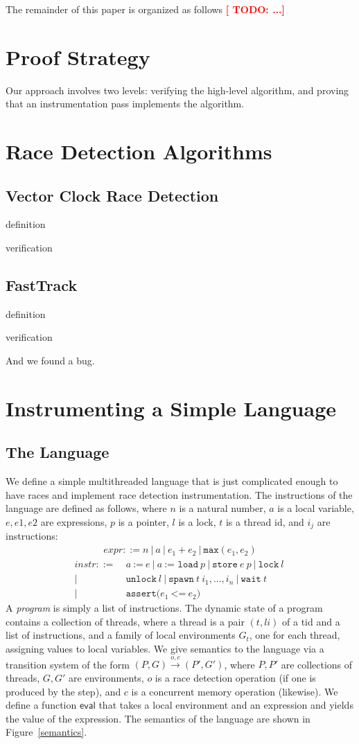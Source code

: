 \documentclass[preprint, 10pt]{sigplanconf}
\newcommand{\TODO}[1]{\textbf{\textcolor{red}{[ TODO: #1]}}}
\newcommand{\assign}[2]{#1\ \texttt{:=}\ #2}
\newcommand{\load}[2]{#1\ \texttt{:= load}\ #2}
\newcommand{\store}[2]{\texttt{store}\ #2\ #1}
\newcommand{\lock}[1]{\texttt{lock}\ #1}
\newcommand{\unlock}[1]{\texttt{unlock}\ #1}
\newcommand{\spawn}[2]{\texttt{spawn}\ #1\ #2}
\newcommand{\wait}[1]{\texttt{wait}\ #1}
\newcommand{\assert}[2]{\texttt{assert(}#1\ \texttt{<=}\ #2\texttt{)}}
\begin{document}
The remainder of this paper is organized as follows \TODO{...}

\section{Proof Strategy}
Our approach involves two levels: verifying the high-level algorithm, and proving that an instrumentation pass implements the algorithm.

\section{Race Detection Algorithms}
\subsection{Vector Clock Race Detection}
definition

verification

\subsection{FastTrack}
definition

verification

And we found a bug.

\section{Instrumenting a Simple Language}
\subsection{The Language}
We define a simple multithreaded language that is just complicated enough to have races and implement race detection instrumentation. The instructions of the language are defined as follows, where $n$ is a natural number, $a$ is a local variable, $e, e1, e2$ are expressions, $p$ is a pointer, $l$ is a lock, $t$ is a thread id, and $i_j$ are instructions:
\begin{align*}\mathit{expr} ::= n~|~a~|~e_1 + e_2~|~\mathtt{max}(e_1, e_2)\end{align*}
\begin{align*}\mathit{instr} ::=\ &\assign{a}{e}~|~\load{a}{p}~|~\store{p}{e}~|~\lock{l}~\\|~&\unlock{l}~|~\spawn{t}{i_1, ..., i_n}~|~\wait{t}~\\|~&\assert{e_1}{e_2}\end{align*}
A \emph{program} is simply a list of instructions. The dynamic state of a program contains a collection of threads, where a thread is a pair $(t, \mathit{li})$ of a tid and a list of instructions, and a family of local environments $G_t$, one for each thread, assigning values to local variables. We give semantics to the language via a transition system of the form $(P, G) \xrightarrow{o, c} (P', G')$, where $P, P'$ are collections of threads, $G, G'$ are environments, $o$ is a race detection operation (if one is produced by the step), and $c$ is a concurrent memory operation (likewise). We define a function $\mathsf{eval}$ that takes a local environment and an expression and yields the value of the expression. The semantics of the language are shown in Figure~\ref{semantics}.
\end{document}
